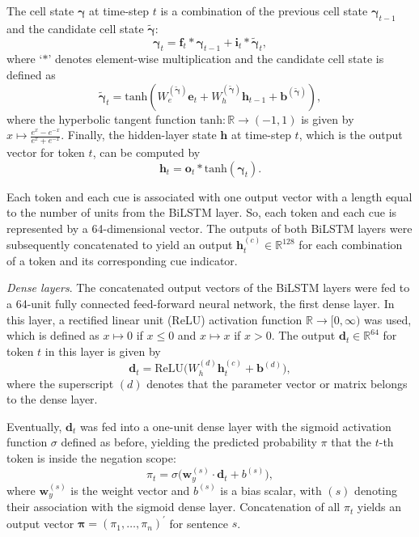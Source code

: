 \documentclass{article}
\begin{document}
\begin{multicols}{2}
The cell state $\boldsymbol{\gamma}$ at time-step $t$ is a combination of the previous cell state $\boldsymbol{\gamma}_{t-1}$ and the candidate cell state $\tilde{\boldsymbol{\gamma}}$: $$\boldsymbol{\gamma}_t=\mathbf{f}_t * \boldsymbol{\gamma}_{t-1} + \mathbf{i}_t * \tilde{\boldsymbol{\gamma}}_{t},$$ where `$*$' denotes element-wise multiplication and the candidate cell state is defined as $$\tilde{\boldsymbol{\gamma}}_t=\mathrm{tanh}(W_e^{(\tilde{\boldsymbol{\gamma}})}\mathbf{e}_t + W_h^{(\tilde{\boldsymbol{\gamma}})}\mathbf{h}_{t-1} + \mathbf{b}^{(\tilde{\boldsymbol{\gamma}})}),$$ where the hyperbolic tangent function $\mathrm{tanh}: \mathbb{R}\rightarrow(-1,1)$ is given by $x \mapsto\frac{e^x-e^{-x}}{e^x+e^{-x}}.$ Finally, the hidden-layer state $\mathbf{h}$ at time-step $t$, which is the output vector for token $t$, can be computed by $$\mathbf{h}_t=\mathbf{o}_t * \mathrm{tanh}(\boldsymbol{\gamma}_t).$$

Each token and each cue is associated with one output vector with a length equal to the number of units from the BiLSTM layer. So, each token and each cue is represented by a 64-dimensional vector. The outputs of both BiLSTM layers were subsequently concatenated to yield an output $\mathbf{h}^{(c)}_t\in\mathbb{R}^{128}$ for each combination of a token and its corresponding cue indicator. \newline

\textit{Dense layers}.
The concatenated output vectors of the BiLSTM layers were fed to a 64-unit fully connected feed-forward neural network, the first dense layer. In this layer, a rectified linear unit (ReLU) activation function $\mathbb{R} \rightarrow [0,\infty)$ was used, which is defined as $x \mapsto 0$ if $x\le0$ and $x \mapsto x$ if $x > 0$. The output $\mathbf{d}_t \in \mathbb{R}^{64}$ for token $t$ in this layer is given by $$\mathbf{d}_t = \mathrm{ReLU}\big( W_h^{(d)}\mathbf{h}^{(c)}_t + \mathbf{b}^{(d)} \big),$$ where the superscript $(d)$ denotes that the parameter vector or matrix belongs to the dense layer. 

Eventually, $\mathbf{d}_t$ was fed into a one-unit dense layer with the sigmoid activation function $\sigma$ defined as before, yielding the predicted probability $\pi$ that the $t$-th token is inside the negation scope: $$\pi_t = \sigma\big( \mathbf{w}_y^{(s)} \cdot\mathbf{d}_t + b^{(s)} \big),$$ where $\mathbf{w}_y^{(s)}$ is the weight vector and $b^{(s)}$ is a bias scalar, with $(s)$ denoting their association with the sigmoid dense layer. Concatenation of all $\pi_{t}$ yields an output vector $\boldsymbol{\pi} = (\pi_1, \dots, \pi_{n})^{\prime}$ for sentence $s$. \newline


\end{multicols}
\end{document}
